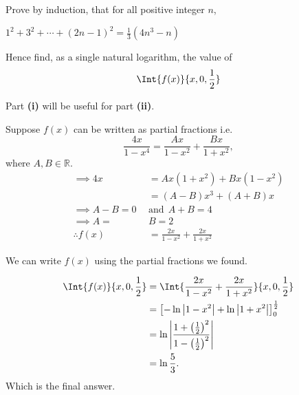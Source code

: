 

\begin{question}
    Prove by induction, that for all positive integer \(n \), 

    \begin{questionparts}
        \item \(1^2 + 3^2 + \cdots + (2n-1)^{2} = \frac{1}{3}(4n^3 - n)\)
        \item Hence find, as a single natural logarithm, the value of \[ \Int{f(x)}{x, 0, \frac{1}{2}} \] 
    \end{questionparts}
    
\end{question}

\begin{solution}
    Part \textbf{(i)} will be useful for part \textbf{(ii)}. 

    \begin{solutionparts}
        \item Suppose \(f(x) \) can be written as partial fractions i.e. 
        \[ \frac{4x}{1-x^4} = \frac{Ax }{1 -x^2} + \frac{Bx }{1 + x^2},  \] where \(A, B \in \mathbb{R }\). 
        \begin{align*}
            \implies 4x &= Ax(1+x^2) + Bx(1-x^2) \\
            &= (A-B)x^3 + (A+B)x \\
            \implies A - B = 0 ~~&\text{and}~~ A+B = 4 \\
            \implies A = ~&B = 2 \\
            \therefore f(x) &= \frac{2x}{1 - x^2} + \frac{2x}{1 + x^2}
        \end{align*}

        \item We can write \(f(x) \) using the partial fractions we found.
        
        \begin{align*}
            \Int{f(x)}{x, 0, \frac{1}{2}}  &= \Int{\frac{2x}{1 - x^2} + \frac{2x}{1 + x^2}}{x, 0, \frac{1}{2}}  \\
            &= \left[ - \ln \left| 1 - x^2 \right| + \ln \left|1 + x^2 \right|\right]_0^\frac{1}{2} \\
            &= \ln \left| \frac{1+ \left(\frac{1}{2}\right)^2}{1 - \left(\frac{1}{2}\right)^2}\right| \\
            &= \ln \frac{5}{3}.
        \end{align*}
        \newpage %
        Which is the final answer. \kant[1]
    \end{solutionparts}
\end{solution}